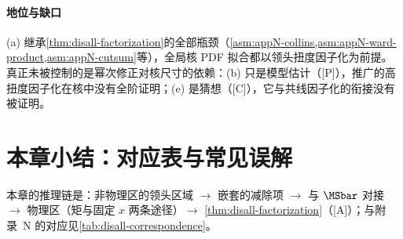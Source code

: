 \paragraph{地位与缺口}
(a) 继承\cref{thm:disall-factorization}的全部瓶颈（\cref{asm:appN-collins,asm:appN-ward-product,asm:appN-cutsum}等），全局核 PDF 拟合都以领头扭度因子化为前提\cite{Eskola:2021nhw,Kovarik:2015cma,AbdulKhalek:2022fyi}。
真正未被控制的是幂次修正对核尺寸的依赖：(b) 只是模型估计（[P]），推广的高扭度因子化在核中没有全阶证明；(e) 是猜想（[C]），它与共线因子化的衔接没有被证明。

\section{本章小结：对应表与常见误解}\label{sec:disall-summary}

本章的推理链是：非物理区的领头区域 $\to$ 嵌套的减除项 $\to$ 与 $\MSbar$ 对接 $\to$ 物理区（矩与固定 $x$ 两条途径）$\to$ \cref{thm:disall-factorization}（[A]）；与附录~N 的对应见\cref{tab:disall-correspondence}。

